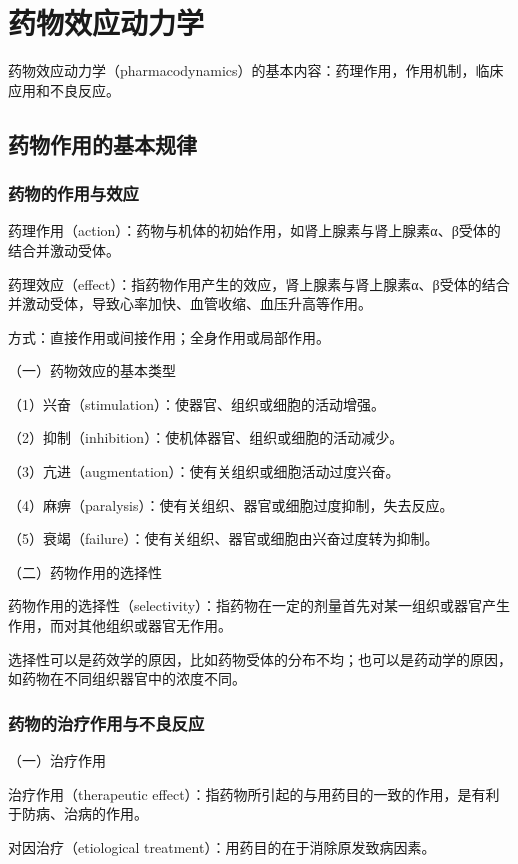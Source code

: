 \chapter{药物效应动力学}

药物效应动力学（pharmacodynamics）的基本内容：药理作用，作用机制，临床应用和不良反应。

\section{药物作用的基本规律}

\subsection{药物的作用与效应}

药理作用（action）：药物与机体的初始作用，如肾上腺素与肾上腺素α、β受体的结合并激动受体。

药理效应（effect）：指药物作用产生的效应，肾上腺素与肾上腺素α、β受体的结合并激动受体，导致心率加快、血管收缩、血压升高等作用。

方式：直接作用或间接作用；全身作用或局部作用。

（一）药物效应的基本类型

（1）兴奋（stimulation）：使器官、组织或细胞的活动增强。

（2）抑制（inhibition）：使机体器官、组织或细胞的活动减少。

（3）亢进（augmentation）：使有关组织或细胞活动过度兴奋。

（4）麻痹（paralysis）：使有关组织、器官或细胞过度抑制，失去反应。

（5）衰竭（failure）：使有关组织、器官或细胞由兴奋过度转为抑制。

（二）药物作用的选择性

药物作用的选择性（selectivity）：指药物在一定的剂量首先对某一组织或器官产生作用，而对其他组织或器官无作用。

选择性可以是药效学的原因，比如药物受体的分布不均；也可以是药动学的原因，如药物在不同组织器官中的浓度不同。

\subsection{药物的治疗作用与不良反应}

（一）治疗作用

治疗作用（therapeutic
effect）：指药物所引起的与用药目的一致的作用，是有利于防病、治病的作用。

对因治疗（etiological treatment）：用药目的在于消除原发致病因素。

